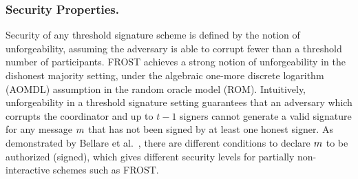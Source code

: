 \subsubsection{Security Properties.}
Security of any threshold signature scheme is defined by the notion of unforgeability,
assuming the adversary is able to corrupt fewer than a threshold number of participants. 
FROST achieves a strong notion of unforgeability in the dishonest majority setting,
    under the algebraic one-more discrete logarithm (AOMDL) assumption in the random oracle model (ROM). 
Intuitively, unforgeability in a threshold signature setting guarantees that an adversary which corrupts the coordinator  and up to $t-1$ signers cannot generate a valid signature for any message $m$ that has not been signed by at least one honest signer. 
As demonstrated by Bellare et al.~\cite{BellareCKMTZ22}, there are different conditions to declare $m$ to be authorized (signed), 
which gives different security levels for partially non-interactive schemes such as FROST.


\medskip

